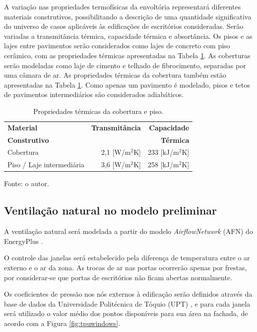 \documentclass[brazil,hardcopy,openany,a5paper]{ufscthesis}
\begin{document}
		A variação nas propriedades termofísicas da envoltória representará diferentes materiais construtivos, possibilitando a descrição de uma quantidade significativa do universo de casos aplicáveis às edificações de escritórios consideradas. Serão variadas a transmitância térmica, capacidade térmica e absortância. Os pisos e as lajes entre pavimentos serão considerados como lajes de concreto com piso cerâmico, com as propriedades térmicas apresentadas na Tabela \ref{table:lajecob}. As coberturas serão modeladas como laje de cimento e telhado de fibrocimento, separadas por uma câmara de ar. As propriedades térmicas da cobertura também estão apresentadas na Tabela \ref{table:lajecob}. Como apenas um pavimento é modelado, pisos e tetos de pavimentos intermediários são considerados adiabáticos.
		
		\begin{table}[h]
			\centering
			\caption{Propriedades térmicas da cobertura e piso.}
			\label{table:lajecob}
			\begin{tabular}{|l |r |r |}
				\hline
				\textbf{Material} & \textbf{Transmitância} & \textbf{Capacidade}\\
				\textbf{Construtivo} & \textbf{ } & \textbf{Térmica}\\
				\hline
				Cobertura & 2,1 [W/m$^2$K] & 233 [kJ/m$^2$K] \\
				\hline
				Piso / Laje intermediária & 3,6 [W/m$^2$K] & 258 [kJ/m$^2$K] \\
				\hline
			\end{tabular}
			\begin{flushleft}
				Fonte: o autor.
			\end{flushleft}				
		\end{table}
		
		\subsection{Ventilação natural no modelo preliminar}
		
		A ventilação natural será modelada a partir do modelo \textit{AirflowNetwork} (AFN) do EnergyPlus \cite{EnergyPlus2018}.
		
		O controle das janelas será estabelecido pela diferença de temperatura entre o ar externo e o ar da zona. As trocas de ar nas portas ocorrerão apenas por frestas, por considerar-se que portas de escritórios não ficam abertas normalmente.
		
		Os coeficientes de pressão nos nós externos à edificação serão definidos através da base de dados da Universidade Politécnica de Tóquio (UPT) \cite{TPU2018}, e para cada janela será utilizado o valor médio dos pontos disponíveis para sua área na fachada, de acordo com a Figura \ref{fig:tpuwindows}.
		
\end{document}
